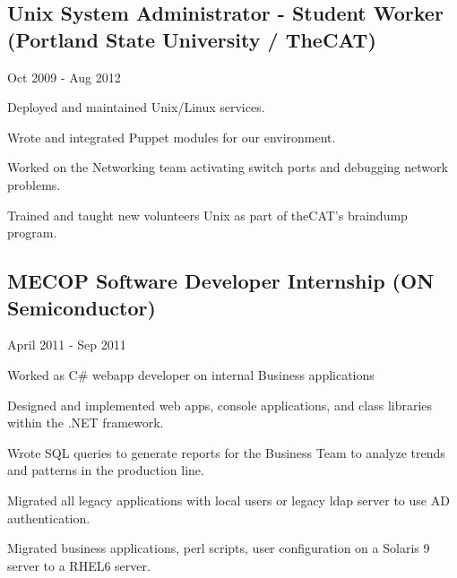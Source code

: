 \documentclass[10pt,letterpaper]{article}
\renewenvironment{itemize}{
  \begin{list}{}{
    \setlength{\leftmargin}{1.5em}
    \setlength{\itemsep}{0.25em}
    \setlength{\parskip}{0pt}
    \setlength{\parsep}{0.25em}
  }
}{
  \end{list}
}
\begin{document}
\subsection*{Unix System Administrator - Student Worker (Portland State University / TheCAT)}
\begin{itemize}

    \item Oct 2009 - Aug 2012
    \item Deployed and maintained Unix/Linux services.
    \item Wrote and integrated Puppet modules for our environment.
    \item Worked on the Networking team activating switch ports and debugging network problems.
    \item Trained and taught new volunteers Unix as part of theCAT's braindump program.


\end{itemize}

\subsection*{MECOP Software Developer Internship (ON Semiconductor)}
\begin{itemize}

    \item April 2011 - Sep 2011
    \item Worked as C\# webapp developer on internal Business applications
    \item Designed and implemented web apps, console applications, and class libraries within the .NET framework.
    \item Wrote SQL queries to generate reports for the Business Team to analyze trends and patterns in the production line.
    \item Migrated all legacy applications with local users or legacy ldap server to use AD authentication.
    \item Migrated business applications, perl scripts, user configuration on a Solaris 9 server to a RHEL6 server.

\end{itemize}
\end{document}
